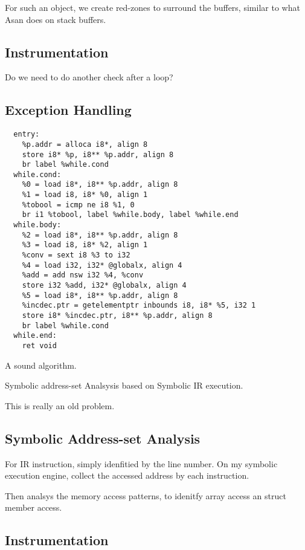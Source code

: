 For such an object, we create red-zones to surround the buffers, similar to what Asan does on stack buffers.

\subsection{Instrumentation}

Do we need to do another check after a loop?

\subsection{Exception Handling}


\begin{verbatim}
  entry:
    %p.addr = alloca i8*, align 8
    store i8* %p, i8** %p.addr, align 8
    br label %while.cond  
  while.cond:
    %0 = load i8*, i8** %p.addr, align 8
    %1 = load i8, i8* %0, align 1
    %tobool = icmp ne i8 %1, 0
    br i1 %tobool, label %while.body, label %while.end
  while.body:    
    %2 = load i8*, i8** %p.addr, align 8
    %3 = load i8, i8* %2, align 1
    %conv = sext i8 %3 to i32
    %4 = load i32, i32* @globalx, align 4
    %add = add nsw i32 %4, %conv
    store i32 %add, i32* @globalx, align 4
    %5 = load i8*, i8** %p.addr, align 8
    %incdec.ptr = getelementptr inbounds i8, i8* %5, i32 1
    store i8* %incdec.ptr, i8** %p.addr, align 8
    br label %while.cond  
  while.end:
    ret void
\end{verbatim}

A sound algorithm.

Symbolic address-set Analsysis based on Symbolic IR execution.

This is really an old problem.






\subsection{Symbolic Address-set Analysis}
For IR instruction, simply idenfitied by the line number.
On my symbolic execution engine, collect the accessed address by each instruction.

Then analsys the memory access patterns, to
idenitfy array access an struct member access.




\subsection{Instrumentation}

